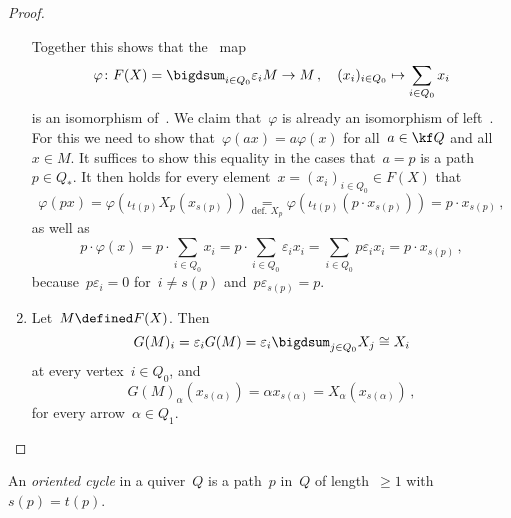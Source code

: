 \begin{proof}
\begin{enumerate}
      Together this shows that the~{\klin} map
      \[
                \varphi
        \colon  F(X)
        =       \bigdsum_{i \in Q_0} \varepsilon_i M
        \to     M \,,
        \quad   (x_i)_{i \in Q_0}
        \mapsto \sum_{i \in Q_0} x_i
      \]
      is an isomorphism of~{\modules{$\kf$}}.
      We claim that~$\varphi$ is already an isomorphism of left~{}.
      For this we need to show that~$\varphi(ax) = a \varphi(x)$ for all~$a \in \kf Q$ and all~$x \in M$.
      It suffices to show this equality in the cases that~$a = p$ is a path~$p \in Q_*$.
      It then holds for every element~$x = (x_i)_{i \in Q_0} \in F(X)$ that
      \[
        \varphi(px)
        =
        \varphi( \iota_{t(p)} X_p( x_{s(p)} ) )
        \underset{ \text{def.~$X_p$} }{=}
        \varphi( \iota_{t(p)}( p \cdot x_{s(p)} ) )
        =
        p \cdot x_{s(p)}  \,,
      \]
      as well as
      \[
          p \cdot \varphi(x)
        = p \cdot \sum_{i \in Q_0} x_i
        = p \cdot \sum_{i \in Q_0} \varepsilon_i x_i
        = \sum_{i \in Q_0} p \varepsilon_i x_i
        = p \cdot x_{s(p)} \,,
      \]
      because~$p \varepsilon_i = 0$ for~$i \neq s(p)$ and~$p \varepsilon_{s(p)} = p$.
    \item
      Let~$M \defined F(X)$.
      Then
      \[
              G(M)_i
        =     \varepsilon_i G(M)
        =     \varepsilon_i \bigdsum_{j \in Q_0} X_j
        \cong X_i
      \]
      at every vertex~$i \in Q_0$, and
      \[
          G(M)_\alpha( x_{s(\alpha)} )
        = \alpha x_{s(\alpha)}
        = X_\alpha( x_{s(\alpha)} ) \,,
      \]
      for every arrow~$\alpha \in Q_1$.
    \qedhere
  \end{enumerate}
\end{proof}


\begin{definition*}
  An \emph{oriented cycle} in a quiver~$Q$ is a path~$p$ in~$Q$ of length~$\geq 1$ with~$s(p) = t(p)$.
\end{definition*}



